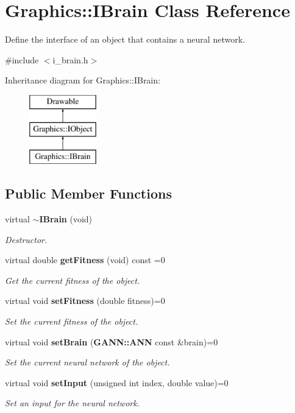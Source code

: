 \section{Graphics\+:\+:I\+Brain Class Reference}
\label{class_graphics_1_1_i_brain}


Define the interface of an object that contains a neural network.  




{\ttfamily \#include $<$i\+\_\+brain.\+h$>$}

Inheritance diagram for Graphics\+:\+:I\+Brain\+:\begin{figure}[H]
\begin{center}
\leavevmode
\includegraphics[height=3.000000cm]{class_graphics_1_1_i_brain}
\end{center}
\end{figure}
\subsection*{Public Member Functions}
\begin{DoxyCompactItemize}
\item 
virtual {\bf $\sim$\+I\+Brain} (void)\label{class_graphics_1_1_i_brain_a9069cd56cdd867929c7f87d90c55f0c8}

\begin{DoxyCompactList}\small\item\em Destructor. \end{DoxyCompactList}\item 
virtual double {\bf get\+Fitness} (void) const  =0
\begin{DoxyCompactList}\small\item\em Get the current fitness of the object. \end{DoxyCompactList}\item 
virtual void {\bf set\+Fitness} (double fitness)=0
\begin{DoxyCompactList}\small\item\em Set the current fitness of the object. \end{DoxyCompactList}\item 
virtual void {\bf set\+Brain} ({\bf G\+A\+N\+N\+::\+A\+N\+N} const \&brain)=0
\begin{DoxyCompactList}\small\item\em Set the current neural network of the object. \end{DoxyCompactList}\item 
virtual void {\bf set\+Input} (unsigned int index, double value)=0
\begin{DoxyCompactList}\small\item\em Set an input for the neural network. \end{DoxyCompactList}\end{DoxyCompactItemize}
